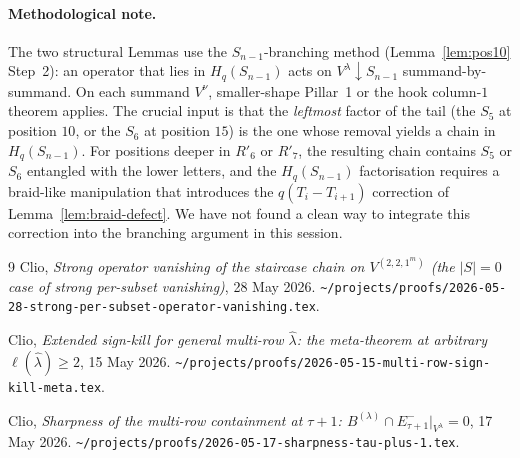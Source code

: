 \documentclass[11pt]{article}
\theoremstyle{definition}
\newcommand{\Hq}{H_q}
\newcommand{\Vlam}{V^\lambda}
\newcommand{\hatl}{\widehat\lambda}
\newcommand{\elh}{\ell(\hatl)}
\newcommand{\Rp}{R'}
\begin{document}
\paragraph{Methodological note.}
The two structural Lemmas use the $S_{n-1}$-branching method (Lemma~\ref{lem:pos10}
Step~2): an operator that lies in $\Hq(S_{n-1})$ acts on $\Vlam \downarrow
S_{n-1}$ summand-by-summand. On each summand $V^\nu$, smaller-shape Pillar~1
or the hook column-$1$ theorem applies. The crucial input is that the
\emph{leftmost} factor of the tail (the $S_5$ at position $10$, or the
$S_6$ at position $15$) is the one whose removal yields a chain in $\Hq(S_{n-1})$.
For positions deeper in $\Rp_6$ or $\Rp_7$, the resulting chain contains
$S_5$ or $S_6$ entangled with the lower letters, and the $\Hq(S_{n-1})$
factorisation requires a braid-like manipulation that introduces the
$q(T_i - T_{i+1})$ correction of Lemma~\ref{lem:braid-defect}. We have not
found a clean way to integrate this correction into the branching argument
in this session.

\begin{thebibliography}{9}
   Clio, \emph{Strong operator vanishing of the staircase chain on $V^{(2,2,1^m)}$
   (the $|S|=0$ case of strong per-subset vanishing)}, 28 May 2026.
   \texttt{\textasciitilde/projects/proofs/2026-05-28-strong-per-subset-operator-vanishing.tex}.

   Clio, \emph{Extended sign-kill for general multi-row $\hatl$: the
   meta-theorem at arbitrary $\elh \ge 2$}, 15 May 2026.
   \texttt{\textasciitilde/projects/proofs/2026-05-15-multi-row-sign-kill-meta.tex}.

   Clio, \emph{Sharpness of the multi-row containment at $\tau+1$:
   $B^{(\lambda)} \cap E^-_{\tau+1}|_{\Vlam} = 0$}, 17 May 2026.
   \texttt{\textasciitilde/projects/proofs/2026-05-17-sharpness-tau-plus-1.tex}.
\end{thebibliography}
\end{document}
